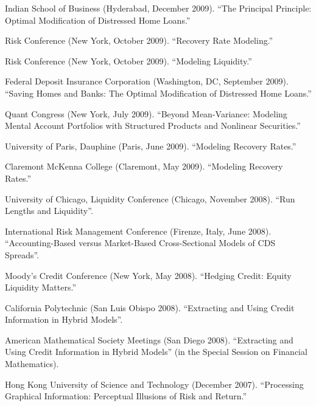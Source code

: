 \documentclass{article}
\begin{document}
\begin{etaremune}
{\item Indian School of Business (Hyderabad, December 2009).
``The Principal Principle: Optimal Modification of Distressed Home Loans.''

\item Risk Conference (New York, October 2009). 
``Recovery Rate Modeling.'' 

\item Risk Conference (New York, October 2009). 
``Modeling Liquidity.'' 

\item Federal Deposit Insurance Corporation (Washington, DC, September 2009).
``Saving Homes and Banks: The Optimal Modification of Distressed Home Loans.''

\item Quant Congress (New York, July 2009).
``Beyond Mean-Variance: Modeling Mental Account Portfolios with Structured Products and Nonlinear Securities.''

\item University of Paris, Dauphine (Paris, June 2009).
``Modeling Recovery Rates.''

\item Claremont McKenna College (Claremont, May 2009).
``Modeling Recovery Rates.''

\item University of Chicago, Liquidity Conference (Chicago, November 2008). 
``Run Lengths and Liquidity''.

\item International Risk Management Conference (Firenze, Italy, June 2008). 
``Accounting-Based versus Market-Based Cross-Sectional Models of CDS Spreads''. 

\item Moody's Credit Conference (New York, May 2008). 
``Hedging Credit: Equity Liquidity Matters.''

\item California Polytechnic (San Luis Obispo 2008). 
``Extracting and Using Credit Information in Hybrid Models''.

\item American Mathematical Society Meetings (San Diego 2008).
``Extracting and Using Credit Information in Hybrid Models'' (in the Special Session 
on Financial Mathematics). 

\item Hong Kong University of Science and Technology (December 2007). 
``Processing Graphical Information: Perceptual Illusions of Risk and Return.''

}
\end{etaremune}
\end{document}
